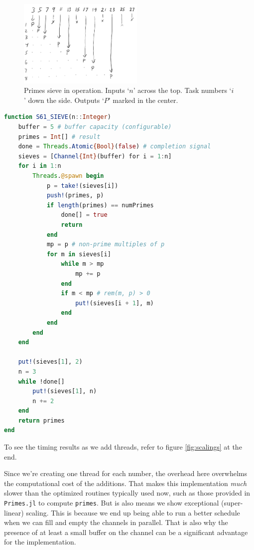 \documentclass{juliacon}
\begin{document}
\begin{figure}[ht]
\centerline{\includegraphics[width=6cm]{images/threads_sieve.png}}
\caption{Primes sieve in operation. Inputs `$n$' across the top. Task numbers `$i$' down the side. Outputs `$P$' marked in the center.}
\label{fig:sieve}
\end{figure}

\begin{lstlisting}[language = Julia]
function S61_SIEVE(n::Integer)
    buffer = 5 # buffer capacity (configurable)
    primes = Int[] # result
    done = Threads.Atomic{Bool}(false) # completion signal
    sieves = [Channel{Int}(buffer) for i = 1:n]
    for i in 1:n
        Threads.@spawn begin
            p = take!(sieves[i])
            push!(primes, p)
            if length(primes) == numPrimes
                done[] = true
                return
            end
            mp = p # non-prime multiples of p
            for m in sieves[i]
                while m > mp
                    mp += p
                end
                if m < mp # rem(m, p) > 0
                    put!(sieves[i + 1], m)
                end
            end
        end
    end

    put!(sieves[1], 2)
    n = 3
    while !done[]
        put!(sieves[1], n)
        n += 2
    end
    return primes
end
\end{lstlisting}

To see the timing results as we add threads, refer to figure \ref{fig:scalings} at the end.

Since we're creating one thread for each number, the overhead here overwhelms the computational cost of the additions. That makes this implementation \textit{much} slower than the optimized routines typically used now, such as those provided in \verb|Primes.jl| to compute \verb|primes|. But is also means we show exceptional (super-linear) scaling. This is because we end up being able to run a better schedule when we can fill and empty the channels in parallel. That is also why the presence of at least a small buffer on the channel can be a significant advantage for the implementation.
\end{document}
